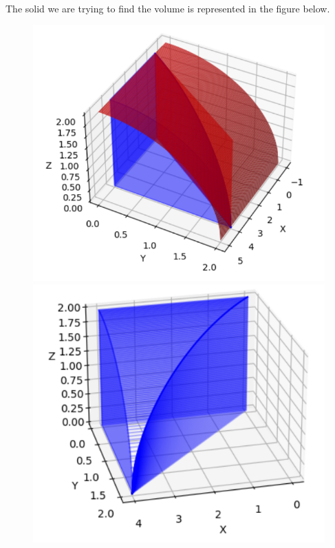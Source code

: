 	\\
	The solid we are trying to find the volume is represented in the figure below.
	\begin{figure}[h]
	\centering
	\includegraphics[scale=0.4]{sketchExo30.png}
	\includegraphics[scale=0.4]{sketchExo30-Solid.png}
	\end{figure}
	
